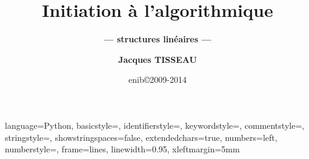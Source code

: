 


\newtheorem{rem}{Remarque}[section]
\newtheorem{defin}{Définition}[section]
\newtheorem{td}{\color{blue}TD}[section]

\lstset
{
language=Python,
basicstyle=\ttfamily,
identifierstyle=\ttfamily,
keywordstyle=\color{blue}\ttfamily,
commentstyle=\color{gray}\ttfamily,
stringstyle=\color{green}\ttfamily,
showstringspaces=false,
extendedchars=true,
numbers=left, 
numberstyle=\tiny,
frame=lines,
linewidth=0.95\textwidth,
xleftmargin=5mm
} 

\def\exo#1{\mbox{}\ \hfill\mbox{\color{blue}$\rule{2mm}{2mm}\,$\footnotesize\sc TD\ref{#1}}}
\def\exercice#1#2{\mbox{}\ \ TD \ref{#1}\ #2\ \dotfill\ \pageref{#1}\mbox{}}

\newenvironment{py}[1]{\begin{minipage}[t]{#1}\footnotesize}{\end{minipage}}

\graphicspath{{../../fig/}}

\title[Algorithmique]{\bf Initiation à l'algorithmique}
\subtitle{\bf --- structures linéaires ---}

\author[\tt jacques.tisseau@enib.fr]{\large\bf Jacques TISSEAU}
\institute[\enib]{{\large\enib--\cerv}}
\date[enib\copyright 2009-2014]{\footnotesize enib\copyright 2009-2014}



